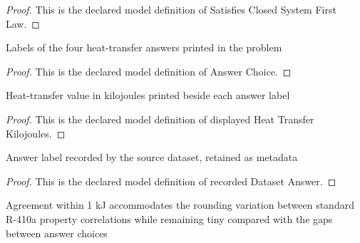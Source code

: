 \begin{proof}
  This is the declared model definition of Satisfies Closed System First Law.
\end{proof}
\begin{definition}
  \label{def:physics:phyx-mini-0464:phyxminiproblems-problemphyxmini0464-answerchoice}
  Labels of the four heat-transfer answers printed in the problem
\end{definition}
\begin{proof}
  This is the declared model definition of Answer Choice.
\end{proof}
\begin{definition}
  \label{def:physics:phyx-mini-0464:phyxminiproblems-problemphyxmini0464-displayedheattransferkilojoules}
  Heat-transfer value in kilojoules printed beside each answer label
\end{definition}
\begin{proof}
  This is the declared model definition of displayed Heat Transfer Kilojoules.
\end{proof}
\begin{definition}
  \label{def:physics:phyx-mini-0464:phyxminiproblems-problemphyxmini0464-recordeddatasetanswer}
  Answer label recorded by the source dataset, retained as metadata
\end{definition}
\begin{proof}
  This is the declared model definition of recorded Dataset Answer.
\end{proof}
\begin{definition}
  \label{def:physics:phyx-mini-0464:phyxminiproblems-problemphyxmini0464-agreeswithdisplayedheatwithinonekilojoule}
  Agreement within 1 kJ accommodates the rounding variation between standard R-410a property correlations while remaining tiny compared with the gaps between answer choices
\end{definition}
